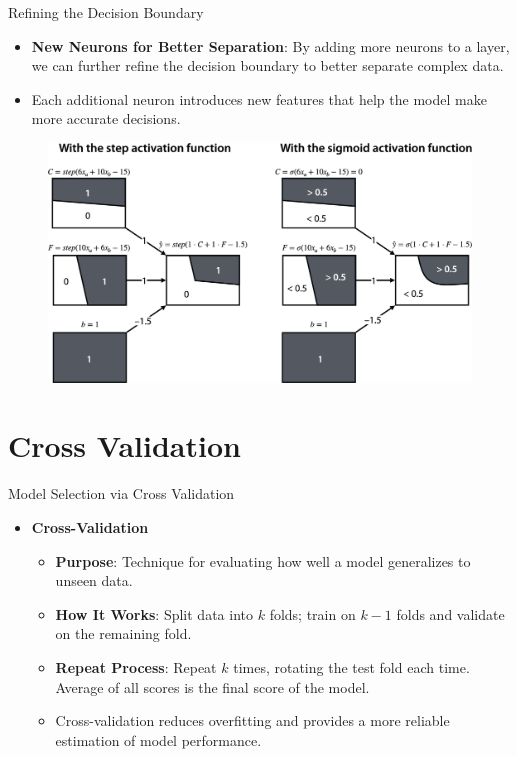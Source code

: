 \documentclass[serif, aspectratio=169]{beamer}
\begin{document}
\begin{frame}{Refining the Decision Boundary}
    \begin{itemize}
        \item \justifying \textbf{New Neurons for Better Separation}:
        By adding more neurons to a layer, we can further refine the decision boundary to better separate complex data.
        \item \justifying Each additional neuron introduces new features that help the model make more accurate decisions.
    \end{itemize}
    \begin{figure}
        \centering
        \includegraphics[width=0.53\linewidth]{pic/Figure_22.png}
    \end{figure}
\end{frame}



\section{Cross Validation}

\begin{frame}{Model Selection via Cross Validation}
    \begin{itemize}
        \item \textbf{Cross-Validation}
        \medskip
        \begin{itemize}\itemsep1em
            \item \justifying \textbf{Purpose}:
            Technique for evaluating how well a model generalizes to unseen data.
            \item \justifying \textbf{How It Works}:
            Split data into $k$ folds; train on $k-1$ folds and validate on the remaining fold.
            \item \justifying \textbf{Repeat Process}:
            Repeat $k$ times, rotating the test fold each time. Average of all scores is the final score of the model.
            \item \justifying Cross-validation
            reduces overfitting and provides a more reliable estimation of model performance.
        \end{itemize}
    \end{itemize}
\end{frame}
\end{document}
